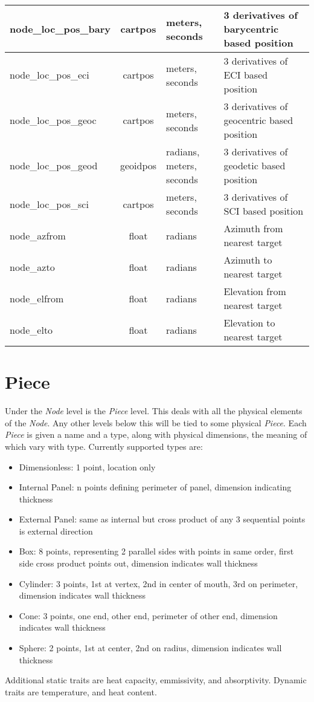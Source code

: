 \documentclass[10pt,letterpaper]{report}
\begin{document}
\begin{tabular}{|l|c|l|l|}
\hline node\_loc\_pos\_bary & cartpos & meters, seconds & 3 derivatives of barycentric based position \\ 
\hline node\_loc\_pos\_eci & cartpos & meters, seconds & 3 derivatives of ECI based position \\ 
\hline node\_loc\_pos\_geoc & cartpos & meters, seconds & 3 derivatives of geocentric based position \\ 
\hline node\_loc\_pos\_geod & geoidpos & radians, meters, seconds & 3 derivatives of geodetic based position \\ 
\hline node\_loc\_pos\_sci & cartpos & meters, seconds & 3 derivatives of SCI based position \\ 
\hline node\_azfrom & float &radians & Azimuth from nearest target \\ 
\hline node\_azto & float & radians & Azimuth to nearest target \\ 
\hline node\_elfrom & float & radians & Elevation from nearest target \\ 
\hline node\_elto & float & radians & Elevation to nearest target \\ 
\hline 
\end{tabular} 
\section{Piece}
Under the \textit{Node} level is the \textit{Piece} level. This deals with all the physical elements of the \textit{Node}. Any other levels below this will be tied to some physical \textit{Piece}. Each \textit{Piece} is given a name and a type, along with physical dimensions, the meaning of which vary with type. Currently supported types are:
\begin{itemize}
\item Dimensionless: 1 point, location only
\item Internal Panel: n points defining perimeter of panel, dimension indicating thickness
\item External Panel: same as internal but cross product of any 3 sequential points is external direction
\item Box: 8 points, representing 2 parallel sides with points in same order, first side cross product points out, dimension indicates wall thickness
\item Cylinder: 3 points, 1st at vertex, 2nd in center of mouth, 3rd on perimeter, dimension indicates wall thickness 
\item Cone: 3 points, one end, other end, perimeter of other end, dimension indicates wall thickness
\item Sphere: 2 points, 1st at center, 2nd on radius, dimension indicates wall thickness
\end{itemize}
Additional static traits are heat capacity, emmissivity, and absorptivity. Dynamic traits are temperature, and heat content.
\end{document}
